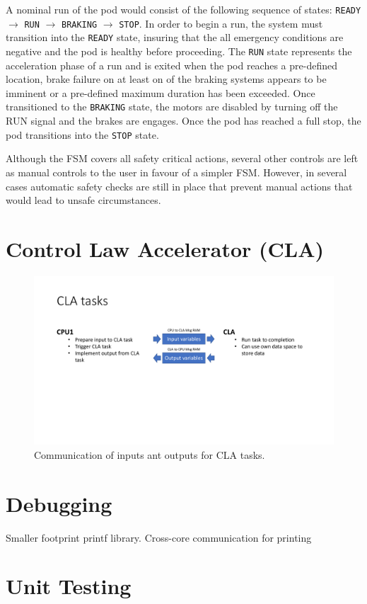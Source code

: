 A nominal run of the pod would consist of the following sequence of states: \texttt{READY} $\rightarrow$ \texttt{RUN} $\rightarrow$ \texttt{BRAKING} $\rightarrow$ \texttt{STOP}. In order to begin a run, the system must transition into the \texttt{READY} state, insuring that the all emergency conditions are negative and the pod is healthy before proceeding. The \texttt{RUN} state represents the acceleration phase of a run and is exited when the pod reaches a pre-defined location, brake failure on at least on of the braking systems appears to be imminent or a pre-defined maximum duration has been exceeded. Once transitioned to the \texttt{BRAKING} state, the motors are disabled by turning off the RUN signal and the brakes are engages. Once the pod has reached a full stop, the pod transitions into the \texttt{STOP} state.

Although the FSM covers all safety critical actions, several other controls are left as manual controls to the user in favour of a simpler FSM. However, in several cases automatic safety checks are still in place that prevent manual actions that would lead to unsafe circumstances.

\section{Control Law Accelerator (CLA)}

\begin{figure}[H]
    \centering \includegraphics[width=1.0\textwidth]{./figures/CLA_communication.pdf}
    \caption{Communication of inputs ant outputs for CLA tasks.}
    \label{fig:CLA_communication}
\end{figure}

\section{Debugging}

Smaller footprint printf library. Cross-core communication for printing

\section{Unit Testing}
